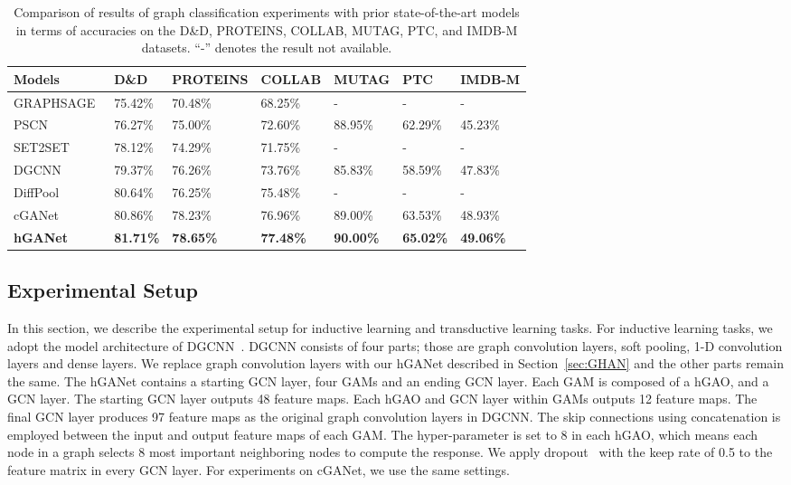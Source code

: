 \documentclass[sigconf]{acmart}
\begin{document}
\begin{table*}[t]
\centering \caption{Comparison of results of graph classification experiments with prior state-of-the-art
models in terms of accuracies on the
D\&D, PROTEINS, COLLAB, MUTAG, PTC, and IMDB-M datasets. ``-'' denotes the result not available.}
\label{table:induc}
\begin{tabularx}{\textwidth}{  X  YYYYYY }
    \hline
    \textbf{Models} & \textbf{D\&D} & \textbf{PROTEINS} & \textbf{COLLAB} & \textbf{MUTAG} & \textbf{PTC} & \textbf{IMDB-M} \\ \hline\hline
    GRAPHSAGE~\cite{hamilton2017inductive}      & 75.42\% & 70.48\%  & 68.25\%  & - & - & -  \\ \hline
    PSCN~\cite{niepert2016learning}             & 76.27\% & 75.00\%  & 72.60\%  & 88.95\% & 62.29\% & 45.23\%  \\ \hline
    SET2SET~\cite{vinyals2015order}             & 78.12\% & 74.29\%  & 71.75\%  & - & - & -  \\ \hline
    DGCNN~\cite{zhang2018end}                   & 79.37\% & 76.26\%  & 73.76\%  & 85.83\% & 58.59\% & 47.83\%  \\ \hline
    DiffPool~\cite{ying2018hierarchical}        & 80.64\% & 76.25\%  & 75.48\%  & - & - & - \\ \hline
    cGANet      & 80.86\% & 78.23\%  & 76.96\%  & 89.00\%  & 63.53\% & 48.93\% \\ \hline
    \textbf{hGANet}                      & \textbf{81.71\%}   & \bf 78.65\% & \bf 77.48\%
                                                & \textbf{90.00\%}   & \textbf{65.02\%} & \textbf{49.06\%} \\ \hline
    \hline
\end{tabularx}
\end{table*}

\subsection{Experimental Setup}\label{sec:expsetup}

In this section, we describe the experimental setup for inductive
learning and transductive learning tasks. For inductive learning
tasks, we adopt the model architecture of DGCNN~\cite{zhang2018end}.
DGCNN consists of four parts; those are graph convolution layers,
soft pooling, 1-D convolution layers and dense layers. We replace
graph convolution layers with our hGANet described in
Section~\ref{sec:GHAN} and the other parts remain the same. The
hGANet contains a starting GCN layer, four GAMs and an ending GCN
layer. Each GAM is composed of a hGAO, and a GCN layer. The starting
GCN layer outputs 48 feature maps. Each hGAO and GCN layer within
GAMs outputs 12 feature maps. The final GCN layer produces 97
feature maps as the original graph convolution layers in DGCNN. The
skip connections using concatenation is employed between the input
and output feature maps of each GAM. The hyper-parameter  is set
to 8 in each hGAO, which means each node in a graph selects 8 most
important neighboring nodes to compute the response. We apply
dropout~\cite{srivastava2014dropout} with the keep rate of 0.5 to
the feature matrix in every GCN layer. For experiments on cGANet,
we use the same settings.
\end{document}
